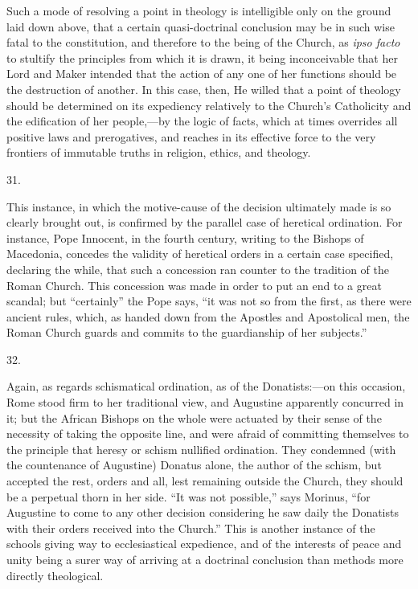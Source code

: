 Such a mode of resolving a point in theology is intelligible only
on the ground laid down above, that a certain quasi-doctrinal
conclusion may be in such wise fatal to the constitution, and
therefore to the being of the Church, as \emph{ipso facto} to stultify
the principles from which it is drawn, it being inconceivable that her
Lord and Maker intended that the action of any one of her functions
should be the destruction of another. In this case, then, He willed
that a point of theology should be determined on its expediency
relatively to the Church's Catholicity and the edification of her
people,—by the logic of facts, which at times overrides all positive
laws and prerogatives, and reaches in its effective force to the very
frontiers of immutable truths in religion, ethics, and theology.

31.

This instance, in which the motive-cause of the decision ultimately
made is so clearly brought out, is confirmed by the parallel case of
heretical ordination. For instance, Pope Innocent, in the fourth
century, writing to the Bishops of Macedonia, concedes the validity of
heretical orders in a certain case specified, declaring the while,
that such a concession ran counter to the tradition of the Roman Church. This concession was made in order to put an end to a great
scandal; but ``certainly'' the Pope says, ``it was not so
from the first, as there were ancient rules, which, as handed down
from the Apostles and Apostolical men, the Roman Church guards and
commits to the guardianship of her subjects.''

32.

Again, as regards schismatical ordination, as of the Donatists:—on
this occasion, Rome stood firm to her traditional view, and Augustine
apparently concurred in it; but the African Bishops on the whole were
actuated by their sense of the necessity of taking the opposite line,
and were afraid of committing themselves to the principle that heresy
or schism nullified ordination. They condemned (with the countenance
of Augustine) Donatus alone, the author of the schism, but accepted
the rest, orders and all, lest remaining outside the Church, they
should be a perpetual thorn in her side. ``It was not
possible,'' says Morinus, ``for Augustine to come to any other
decision considering he saw daily the Donatists with their orders
received into the Church.'' This is another instance of the
schools giving way to ecclesiastical expedience, and of the interests
of peace and unity being a surer way of arriving at a doctrinal
conclusion than methods more directly theological.

